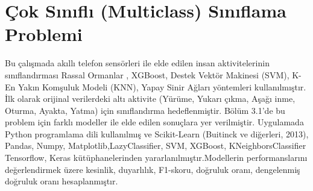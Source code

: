 \documentclass[12pt,twoside]{deuthesis}
\begin{document}
\hypertarget{uxe7ok-sux131nux131flux131-multiclass-sux131nux131flama-problemi}{%
\section{Çok Sınıflı (Multiclass) Sınıflama Problemi}\label{uxe7ok-sux131nux131flux131-multiclass-sux131nux131flama-problemi}}

Bu çalışmada akıllı telefon sensörleri ile elde edilen insan aktivitelerinin sınıflandırması Rassal Ormanlar , XGBoost, Destek Vektör Makinesi (SVM), K-En Yakın Komşuluk Modeli (KNN), Yapay Sinir Ağları yöntemleri kullanılmıştır. İlk olarak orijinal verilerdeki altı aktivite (Yürüme, Yukarı çıkma, Aşağı inme, Oturma, Ayakta, Yatma) için sınıflandırma hedeflenmiştir. Bölüm 3.1'de bu problem için farklı modeller ile elde edilen sonuçlara yer verilmiştir. Uygulamada Python programlama dili kullanılmış ve Scikit-Learn (Buitinck ve diğerleri, 2013), Pandas, Numpy, Matplotlib,LazyClassifier, SVM, XGBoost, KNeighborsClassifier Tensorflow, Keras kütüphanelerinden yararlanılmıştır.Modellerin performanslarını değerlendirmek üzere kesinlik, duyarlılık, F1-skoru, doğruluk oranı, dengelenmiş doğruluk oranı hesaplanmıştır.
\end{document}
